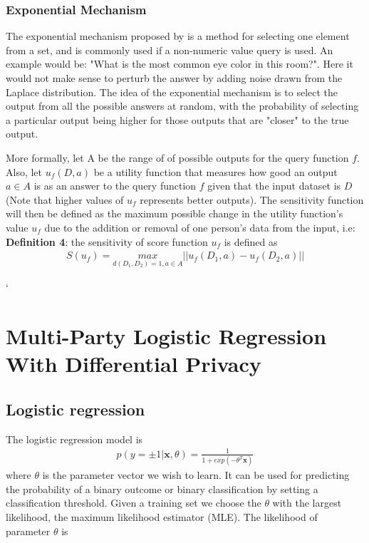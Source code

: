 
\subsubsection{Exponential Mechanism} \label{sec:Exponential Mechanism}
The exponential mechanism proposed by \cite{mcsherry2007} is a method for selecting one element from a set, and is commonly used if a non-numeric value query is used. An example would be: "What is the most common eye color in this room?". Here it would not make sense to perturb the answer by adding noise drawn from the Laplace distribution. The idea of the exponential mechanism is to select the output from all the possible answers at random, with the probability of selecting a particular output being higher for those outputs that are "closer" to the true output. 

More formally, let A be the range of of possible outputs for the query function $f$. Also, let $u_f(D,a)$ be a utility function that measures how good an output $a\in A$ is as an answer to the query function $f$ given that the input dataset is $D$ (Note that higher values of $u_f$ represents better outputs). The sensitivity function will then be defined as the maximum possible change in the utility function's value $u_f$ due to the addition or removal of one person's data from the input, i.e: \newline
\textbf{Definition 4}: the sensitivity of score function $u_f$ is defined as
\begin{eqnarray} \label{ExpoMecDef}
S(u_f) = \underset{d(D_1,D_2)=1,a\in A}{max}||u_f(D_1, a)-u_f(D_2,a)||
 \end{eqnarray}
 
 `
\section{Multi-Party Logistic Regression With Differential Privacy}
\label{sec:logistic_regression}
 
 \subsection{Logistic regression}
 The logistic regression model is
  \begin{eqnarray} 
 p(y = ±1|\textbf{x}, \theta) = \frac{1}{1 + exp( - \theta^T \textbf{x})}
  \end{eqnarray}
  where $\theta$ is the parameter vector we wish to learn.
 It can be used for predicting the probability of a binary outcome or binary classification by setting a classification threshold. Given a training set we choose the $\theta$ with the largest likelihood, the maximum likelihood estimator (MLE)\citep{elkan2014logreg}. The likelihood of parameter $\theta$ is
 
